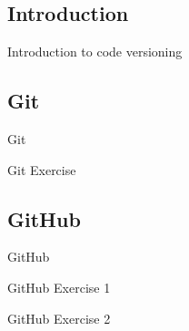 \subsection{Introduction}
\begin{frame}{}
    \huge{Introduction to code versioning}
\end{frame}


\subsection{Git}
\begin{frame}{}
    \huge{Git}
\end{frame}

\begin{frame}{}
    \huge{Git Exercise}
\end{frame}



\subsection{GitHub}
\begin{frame}{}
    \huge{GitHub}
\end{frame}


\begin{frame}{}
    \huge{GitHub Exercise 1}
\end{frame}


\begin{frame}{}
    \huge{GitHub Exercise 2}
\end{frame}




